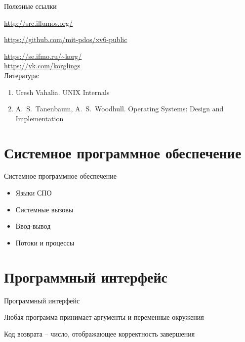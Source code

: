 \documentclass[hyperref={unicode=true}]{beamer}
\begin{document}
\newcommand{\iframe}[1]{
\section{#1}\begin{frame}[fragile]{#1}\par\vspace{-1em}
}
\newcommand{\pframe}[1]{
\begin{frame}[fragile]{#1}\par\vspace{-1em}
}


\pframe{Полезные ссылки}
   \url{http://src.illumos.org/}

   \begin{large}
      \begin{center}
         \url{https://github.com/mit-pdos/xv6-public}
      \end{center}
   \end{large}

   \vspace{1em} \url{https://se.ifmo.ru/~korg/} \\
   \vspace{1em} \url{https://vk.com/korglings} \\
   \vspace{1em} Литература:
   \begin{enumerate}
      \item Uresh Vahalia. UNIX Internals
      \item A.~S.~Tanenbaum, A.~S.~Woodhull. Operating Systems: Design and Implementation
   \end{enumerate}
\end{frame}

\iframe{Системное программное обеспечение}
\begin{itemize}
   \setlength\itemsep{2em}
      \item Языки СПО
      \item Системные вызовы
      \item Ввод-вывод
      \item Потоки и процессы
   \end{itemize}
\end{frame}

\iframe{Программный интерфейс} 
   \begin{center}
      Любая программа принимает аргументы и
      переменные окружения
   \end{center}
   \vspace{1cm} Код возврата – число, отображающее
   корректность завершения
\end{frame}
\end{document}
